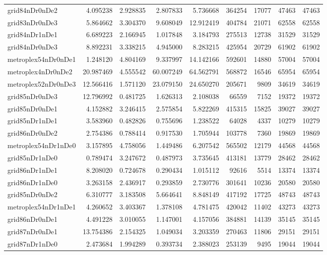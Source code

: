 \documentclass[../../../thesis.tex]{subfiles}
\begin{document}
\begin{longtable}{|l|r|r|r|r|r|r|r|r|}
grid84nDr0nDe2 & 4.095238 & 2.928835 & 2.807833 & 5.736668 & 364254 & 17077 & 47463 & 47463 \\
grid83nDr0nDe3 & 5.864662 & 3.304370 & 9.608049 & 12.912419 & 404784 & 21071 & 62558 & 62558 \\
grid84nDr1nDe1 & 6.689223 & 2.166945 & 1.017848 & 3.184793 & 275513 & 12738 & 31529 & 31529 \\
grid84nDr0nDe3 & 8.892231 & 3.338215 & 4.945000 & 8.283215 & 425954 & 20729 & 61902 & 61902 \\
metroplex54nDr0nDe1 & 1.248120 & 4.804169 & 9.337997 & 14.142166 & 592601 & 14880 & 57004 & 57004 \\
metroplex4nDr0nDe2 & 20.987469 & 4.555542 & 60.007249 & 64.562791 & 568872 & 16546 & 65954 & 65954 \\
metroplex52nDr0nDe3 & 12.566416 & 1.571120 & 23.079150 & 24.650270 & 205671 & 9809 & 34619 & 34619 \\
grid85nDr0nDe3 & 12.796992 & 0.481725 & 1.626313 & 2.108038 & 66559 & 7152 & 19372 & 19372 \\
grid85nDr0nDe1 & 4.152882 & 3.246415 & 2.575854 & 5.822269 & 415315 & 15825 & 39027 & 39027 \\
grid85nDr1nDe1 & 3.583960 & 0.482826 & 0.755696 & 1.238522 & 64028 & 4337 & 10279 & 10279 \\
grid86nDr0nDe2 & 2.754386 & 0.788414 & 0.917530 & 1.705944 & 103778 & 7360 & 19869 & 19869 \\
metroplex54nDr1nDe0 & 3.157895 & 4.758056 & 1.449486 & 6.207542 & 565502 & 12179 & 44568 & 44568 \\
grid85nDr1nDe0 & 0.789474 & 3.247672 & 0.487973 & 3.735645 & 413181 & 13779 & 28462 & 28462 \\
grid86nDr1nDe1 & 8.208020 & 0.724678 & 0.290434 & 1.015112 & 92616 & 5514 & 13374 & 13374 \\
grid86nDr1nDe0 & 3.263158 & 2.436917 & 0.293859 & 2.730776 & 301641 & 10236 & 20580 & 20580 \\
grid85nDr0nDe2 & 6.310777 & 3.183508 & 5.664641 & 8.848149 & 417192 & 17725 & 48743 & 48743 \\
metroplex54nDr1nDe1 & 4.260652 & 3.403367 & 1.378108 & 4.781475 & 420042 & 11402 & 43273 & 43273 \\
grid86nDr0nDe1 & 4.491228 & 3.010055 & 1.147001 & 4.157056 & 384881 & 14139 & 35145 & 35145 \\
grid87nDr0nDe1 & 13.754386 & 2.154325 & 1.049034 & 3.203359 & 270463 & 11806 & 29151 & 29151 \\
grid87nDr1nDe0 & 2.473684 & 1.994289 & 0.393734 & 2.388023 & 253139 & 9495 & 19044 & 19044 \\

\end{longtable}
\end{document}
